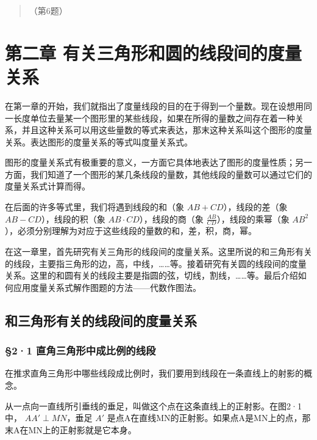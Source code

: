 \begin{quote}
（第6题）
\end{quote}

\chapter{第二章
有关三角形和圆的线段间的度量关系}

在第一章的开始，我们就指出了度量线段的目的在于得到一个量数。现在设想用同一长度单位去量某一个图形里的某些线段，如果在所得的量数之间存在着一种关系，并且这种关系可以用这些量数的等式来表达，那末这种关系叫这个图形的度量关系。表达图形的度量关系的等式叫度量关系式。

图形的度量关系式有极重要的意义，一方面它具体地表达了图形的度量性质；另一方面，我们知道了一个图形的某几条线段的量数，其他线段的量数可以通过它们的度量关系式计算而得。

在后面的许多等式里，我们将遇到线段的和（象 \(AB + CD\)），线段的差（象
\(AB - CD\)），线段的积（象 \(AB \cdot CD\)），线段的商（象
\(\frac{AB}{CD}\)），线段的乘幂（象
\(AB^2\)），必须分别理解为对应于这些线段的量数的和，差，积，商，幂。

在这一章里，首先研究有关三角形的线段间的度量关系。这里所说的和三角形有关的线段，主要指三角形的边，高，中线，\ldots\ldots 等。接着研究有关圆的线段间的度量关系。这里的和圆有关的线段主要是指圆的弦，切线，割线，\ldots\ldots 等。最后介绍如何应用度量关系式解作图题的方法------代数作图法。

\section{和三角形有关的线段间的度量关系}

\subsection{§2·1
直角三角形中成比例的线段}

在推求直角三角形中哪些线段成比例时，我们要用到线段在一条直线上的射影的概念。

从一点向一直线所引垂线的垂足，叫做这个点在这条直线上的正射影。在图2·1中，
\(AA'\perp MN\)，垂足 \(A'\)
是点A在直线MN的正射影。如果点A是MN上的点，那末A在MN上的正射影就是它本身。

